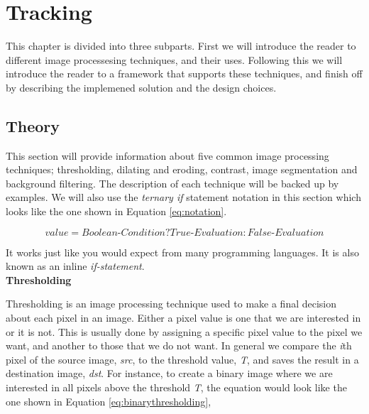 
\section{Tracking}
This chapter is divided into three subparts. First we will introduce the reader to different image processesing techniques, and their uses. Following this we will introduce the reader to a framework that supports these techniques, and finish off by describing the implemened solution and the design choices.

% 
% 

\subsection{Theory}
This section will provide information about five common image processing techniques; thresholding, dilating and eroding, contrast, image segmentation and background filtering. The description of each technique will be backed up by examples. We will also use the \textit{ternary if} statement notation in this section which looks like the one shown in Equation \ref{eq:notation}.

\begin{equation}
value = {Boolean\mbox{-}Condition} ? {True\mbox{-}Evaluation}: {False\mbox{-}Evaluation}
\label{eq:notation}
\end{equation}

It works just like you would expect from many programming languages. It is also known as an inline \textit{if-statement}. \\

\noindent \textbf{Thresholding} \par
Thresholding is an image processing technique used to make a final decision about each pixel in an image. Either a pixel value is one that we are interested in or it is not. This is usually done by assigning a specific pixel value to the pixel we want, and another to those that we do not want. In general we compare the \textit{i}th pixel of the source image, \textit{src}, to the threshold value, \textit{T}, and saves the result in a destination image, \textit{dst}. For instance, to create a binary image where we are interested in all pixels above the threshold \textit{T}, the equation would look like the one shown in Equation \ref{eq:binarythresholding},

